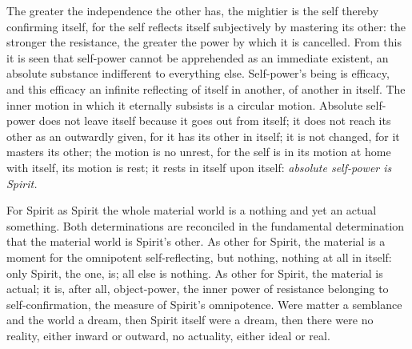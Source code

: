\documentclass[12pt,a4paper]{book}
\begin{document}
The greater the independence the other has, the mightier is the self thereby
confirming itself, for the self reflects itself subjectively by mastering its other:
the stronger the resistance, the greater the power by which it is cancelled. From
this it is seen that self-power cannot be apprehended as an immediate existent, an
absolute substance indifferent to everything else. Self-power's being is efficacy,
and this efficacy an infinite reflecting of itself in another, of another in itself.
The inner motion in which it
eternally subsists is a circular motion. Absolute self-power does not leave itself
because it goes out from itself; it does not reach
its other as an outwardly given, for it has its other in itself; it is not changed,
for it masters its other; the motion is no unrest, for the self is in its motion at
home with itself, its motion is rest; it rests in itself upon itself: \emph{absolute
self-power is Spirit.}

For Spirit as Spirit the whole material world is a nothing and yet an actual
something. Both determinations are reconciled in the fundamental determination that
the material world is Spirit's other. As other for Spirit, the material is a moment
for the omnipotent self-reflecting, but nothing, nothing at all in itself: only
Spirit, the one, is; all else is nothing. As other for Spirit, the material is
actual; it is, after all, object-power, the inner power of resistance belonging to
self-confirmation, the measure of Spirit's omnipotence. Were matter a semblance and
the world a dream, then Spirit itself were a dream, then there were no reality,
either inward or outward, no actuality, either ideal or real.
\end{document}

